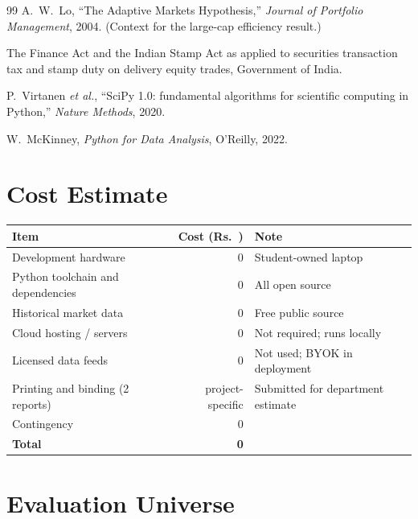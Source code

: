 \documentclass[12pt,a4paper,oneside]{report}
\newcommand{\rupee}{Rs.\ }
\begin{document}
\begin{thebibliography}{99}
 A.~W.~Lo, ``The Adaptive Markets Hypothesis,'' \textit{Journal of
Portfolio Management}, 2004. (Context for the large-cap efficiency result.)

 The Finance Act and the Indian Stamp Act as applied to securities
transaction tax and stamp duty on delivery equity trades, Government of India.

 P.~Virtanen \textit{et al.}, ``SciPy 1.0: fundamental algorithms
for scientific computing in Python,'' \textit{Nature Methods}, 2020.

 W.~McKinney, \textit{Python for Data Analysis}, O'Reilly, 2022.

\end{thebibliography}

\appendix

\chapter{Cost Estimate}\label{app:cost}

\begin{center}
\begin{tabular}{@{}p{7.5cm}rp{3.5cm}@{}}
\toprule
\textbf{Item} & \textbf{Cost (\rupee{})} & \textbf{Note} \\
\midrule
Development hardware & 0 & Student-owned laptop \\
Python toolchain and dependencies & 0 & All open source \\
Historical market data & 0 & Free public source \\
Cloud hosting / servers & 0 & Not required; runs locally \\
Licensed data feeds & 0 & Not used; BYOK in deployment \\
Printing and binding (2 reports) & project-specific & Submitted for department estimate \\
Contingency & 0 & \\
\midrule
\textbf{Total} & \textbf{0} & \\
\bottomrule
\end{tabular}
\end{center}

\chapter{Evaluation Universe}\label{app:universe}
\end{document}
